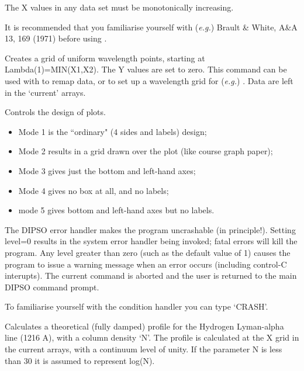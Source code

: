 \begin {description}
The X values in any data set must be monotonically increasing.

It is recommended that you familiarise yourself with ({\em e.g.})
Brault \& White, A\&A 13, 169 (1971) before using . 

Creates a grid of uniform wavelength points, starting at
Lambda(1)=MIN(X1,X2). The Y values are set to zero. This command can
be used with   to remap data, or to set up a wavelength grid for
({\em e.g.}) .  Data are left in the `current' arrays.

Controls the design of plots.

\begin{itemize}
\item Mode 1 is the ``ordinary" (4 sides and labels) design;
\item Mode 2 results in a grid drawn over the plot (like course graph paper);
\item Mode 3 gives just the bottom and left-hand axes;
\item Mode 4 gives no box at all, and no labels;
\item mode 5 gives bottom and left-hand axes but no labels.
\end{itemize}

The DIPSO error handler makes the program uncrashable (in principle!). Setting
level=0 results in the system error handler being invoked; fatal errors will
kill the program. Any level greater than zero (such as the default value of 1)
causes the
program to issue a warning message when an error occurs (including control-C
interupts). The current command is aborted and the user is returned to the main
DIPSO command prompt.

To familiarise yourself with the condition handler you can type `CRASH'.


Calculates a theoretical (fully damped) profile for the Hydrogen
Lyman-alpha line (1216 A), with a column density `N'. The profile is
calculated at the X grid in the current arrays, with a continuum level
of unity. If the parameter N is less than 30 it is assumed to
represent log(N).


\end{description}

